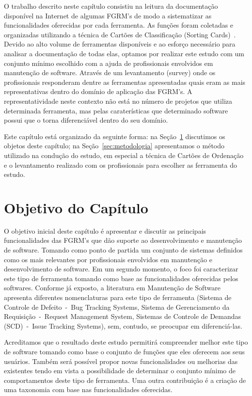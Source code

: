 O trabalho descrito neste capítulo consistiu na leitura da documentação
disponível na Internet de algumas FGRM's de modo a sistematizar as
funcionalidades oferecidas por cada ferramenta.  As funções foram coletadas e
organizadas utilizando a técnica de Cartões de Classificação (Sorting
Cards)~\cite{5070993, rugg2005sorting}. Devido ao alto volume de ferramentas
disponíveis e ao esforço necessário para analisar a documentação de todas elas,
optamos por realizar este estudo com um conjunto mínimo escolhido com a ajuda de
profissionais envolvidos em manutenção de software. Através de um levantamento
(survey) onde os profissionais responderam dentre as ferramentas apresentadas
quais eram as mais representativas dentro do domínio de aplicação das FGRM's. A
representatividade neste contexto não está no número de projetos que utiliza
determinada ferramenta, mas pelas caraterísticas que determinado software possui
que o torna diferenciável dentro do seu domínio.

Este capítulo está organizado da seguinte forma: na
Seção~\ref{sec:objetivo_do_capítulo} discutimos os objetos deste capítulo; na
Seção~\ref{sec:metodologia} apresentamos o método utilizado na condução do
estudo, em especial a técnica de Cartões de Ordenação e o levantamento realizado
com os profissionais para escolher as ferramenta do estudo.

\section{Objetivo do Capítulo}
\label{sec:objetivo_do_capítulo}

O objetivo inicial deste capítulo é apresentar e discutir as principais
funcionalidades das FGRM's que dão suporte ao desenvolvimento e manutenção de
software. Tomando como ponto de partida um conjunto de sistemas definidos como
os mais relevantes por profissionais envolvidos em manutenção e desenvolvimento
de software. Em um segundo momento, o foco foi caracterizar este tipo de
ferramenta tomando como base as funcionalidades oferecidas pelos softwares.
Conforme já exposto, a literatura em Manutenção de Software apresenta diferentes
nomenclaturas para este tipo de ferramenta (Sistema de Controle de Defeito~-~Bug
Tracking Systems, Sistema de Gerenciamento da Requisição~-~Request Management
System, Sistemas de Controle de Demandas (SCD)~-~Issue Tracking Systems), sem,
contudo, se preocupar em diferenciá-las.

Acreditamos que o resultado deste estudo permitirá compreender melhor este tipo
de software tomando como base o conjunto de funções que eles oferecem aos seus
usuários. Também será possível propor novas funcionalidades ou melhorias das
existentes tendo em vista a possibilidade de determinar o conjunto mínimo de
comportamentos deste tipo de ferramenta. Uma outra contribuição é a criação de
uma taxonomia com base nas funcionalidades oferecidas.

